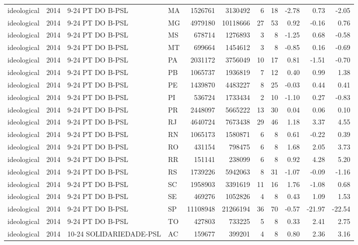 \begin{landscape}
\begin{longtable}{lllL{1.4cm}rrrrrrr}
ideological & 2014 & 9-24 PT DO B-PSL & MA & 1526761 & 3130492 & 6 & 18 & -2.78 & 0.73 & -2.05 \\
ideological & 2014 & 9-24 PT DO B-PSL & MG & 4979180 & 10118666 & 27 & 53 & 0.92 & -0.16 & 0.76 \\
ideological & 2014 & 9-24 PT DO B-PSL & MS & 678714 & 1276893 & 3 & 8 & -1.25 & 0.68 & -0.58 \\
ideological & 2014 & 9-24 PT DO B-PSL & MT & 699664 & 1454612 & 3 & 8 & -0.85 & 0.16 & -0.69 \\
ideological & 2014 & 9-24 PT DO B-PSL & PA & 2031172 & 3756049 & 10 & 17 & 0.81 & -1.51 & -0.70 \\
ideological & 2014 & 9-24 PT DO B-PSL & PB & 1065737 & 1936819 & 7 & 12 & 0.40 & 0.99 & 1.38 \\
ideological & 2014 & 9-24 PT DO B-PSL & PE & 1439870 & 4483227 & 8 & 25 & -0.03 & 0.44 & 0.41 \\
ideological & 2014 & 9-24 PT DO B-PSL & PI & 536724 & 1733434 & 2 & 10 & -1.10 & 0.27 & -0.83 \\
ideological & 2014 & 9-24 PT DO B-PSL & PR & 2448097 & 5665222 & 13 & 30 & 0.04 & 0.06 & 0.10 \\
ideological & 2014 & 9-24 PT DO B-PSL & RJ & 4640724 & 7673438 & 29 & 46 & 1.18 & 3.37 & 4.55 \\
ideological & 2014 & 9-24 PT DO B-PSL & RN & 1065173 & 1580871 & 6 & 8 & 0.61 & -0.22 & 0.39 \\
ideological & 2014 & 9-24 PT DO B-PSL & RO & 431154 & 798475 & 6 & 8 & 1.68 & 2.05 & 3.73 \\
ideological & 2014 & 9-24 PT DO B-PSL & RR & 151141 & 238099 & 6 & 8 & 0.92 & 4.28 & 5.20 \\
ideological & 2014 & 9-24 PT DO B-PSL & RS & 1739226 & 5942063 & 8 & 31 & -1.07 & -0.09 & -1.16 \\
ideological & 2014 & 9-24 PT DO B-PSL & SC & 1958903 & 3391619 & 11 & 16 & 1.76 & -1.08 & 0.68 \\
ideological & 2014 & 9-24 PT DO B-PSL & SE & 469276 & 1052826 & 4 & 8 & 0.43 & 1.09 & 1.53 \\
ideological & 2014 & 9-24 PT DO B-PSL & SP & 11108948 & 21266194 & 36 & 70 & -0.57 & -21.97 & -22.54 \\
ideological & 2014 & 9-24 PT DO B-PSL & TO & 427803 & 733225 & 5 & 8 & 0.33 & 2.41 & 2.75 \\
ideological & 2014 & 10-24 SOLIDARIEDADE-PSL & AC & 159677 & 399201 & 4 & 8 & 0.80 & 2.36 & 3.16 \\

\end{longtable}
\end{landscape}
